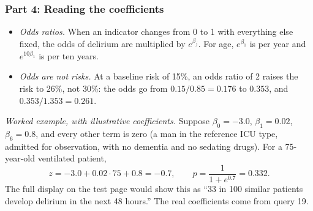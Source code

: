 \documentclass[10pt]{article}
\begin{document}
\subsubsection*{Part 4: Reading the coefficients}

\begin{itemize}
	\item \emph{Odds ratios.} When an indicator changes from 0 to 1 with everything else fixed, the odds of delirium are multiplied by $e^{\beta_j}$. For age, $e^{\beta_1}$ is per year and $e^{10 \beta_1}$ is per ten years.
	\item \emph{Odds are not risks.} At a baseline risk of 15\%, an odds ratio of 2 raises the risk to 26\%, not 30\%: the odds go from $0.15 / 0.85 = 0.176$ to $0.353$, and $0.353 / 1.353 = 0.261$.
\end{itemize}

\emph{Worked example, with illustrative coefficients.} Suppose $\beta_0 = -3.0$, $\beta_1 = 0.02$, $\beta_6 = 0.8$, and every other term is zero (a man in the reference ICU type, admitted for observation, with no dementia and no sedating drugs). For a 75-year-old ventilated patient,
\begin{equation*}
	z = -3.0 + 0.02 \cdot 75 + 0.8 = -0.7 ,
	\qquad
	p = \frac{1}{1 + e^{0.7}} = 0.332 .
\end{equation*}
The full display on the test page would show this as ``33 in 100 similar patients develop delirium in the next 48 hours.'' The real coefficients come from query 19.
\end{document}
